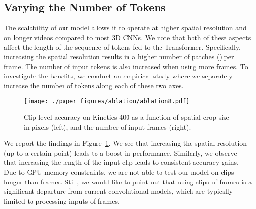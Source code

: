 \documentclass{article}
\begin{document}
\subsection{Varying the Number of Tokens}
\label{abl_sec}

The scalability of our model allows it to operate at higher spatial resolution and on longer videos compared to most 3D CNNs. We note that both of these aspects affect the length of the sequence of tokens fed to the Transformer. Specifically, increasing the spatial resolution results in a higher number of patches () per frame. The number of input tokens is also increased when using more frames. To investigate the benefits, we conduct an empirical study where we separately increase the number of tokens along each of these two axes. 


\begin{figure}
\begin{center}
   \texttt{[image: ./paper\_figures/ablation/ablation8.pdf]}
\end{center}
\vspace{-0.4cm}
\caption{Clip-level accuracy on Kinetics-400 as a function of spatial crop size in pixels (left), and the number of input frames (right). \vspace{-0.3cm}}
\label{abl_fig}
\end{figure}


We report the findings in Figure~\ref{abl_fig}. We see that increasing the spatial resolution (up to a certain point) leads to a boost in performance. Similarly, we observe that increasing the length of the input clip leads to consistent accuracy gains. Due to GPU memory constraints, we are not able to test our model on clips longer than  frames. Still, we would like to point out that using clips of  frames is a significant departure from current convolutional models, which are typically limited to processing inputs of  frames.
\end{document}
